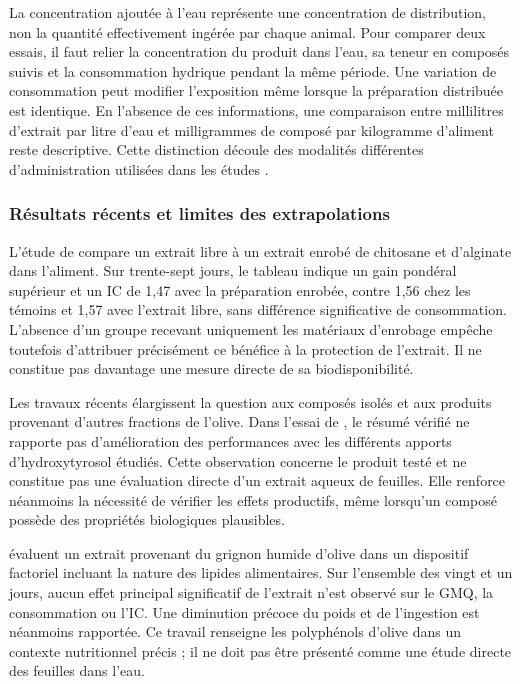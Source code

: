 La concentration ajoutée à l'eau représente une concentration de distribution, non la quantité effectivement ingérée par chaque animal. Pour comparer deux essais, il faut relier la concentration du produit dans l'eau, sa teneur en composés suivis et la consommation hydrique pendant la même période. Une variation de consommation peut modifier l'exposition même lorsque la préparation distribuée est identique. En l'absence de ces informations, une comparaison entre millilitres d'extrait par litre d'eau et milligrammes de composé par kilogramme d'aliment reste descriptive. Cette distinction découle des modalités différentes d'administration utilisées dans les études \citep{Jabri2017,Oke2017,Erener2020}.

\subsubsection{Résultats récents et limites des extrapolations}

L'étude de \citet{Hiba2026} compare un extrait libre à un extrait enrobé de chitosane et d'alginate dans l'aliment. Sur trente-sept jours, le tableau indique un gain pondéral supérieur et un IC de 1,47 avec la préparation enrobée, contre 1,56 chez les témoins et 1,57 avec l'extrait libre, sans différence significative de consommation. L'absence d'un groupe recevant uniquement les matériaux d'enrobage empêche toutefois d'attribuer précisément ce bénéfice à la protection de l'extrait. Il ne constitue pas davantage une mesure directe de sa biodisponibilité.

Les travaux récents élargissent la question aux composés isolés et aux produits provenant d'autres fractions de l'olive. Dans l'essai de \citet{Dias2024Performance}, le résumé vérifié ne rapporte pas d'amélioration des performances avec les différents apports d'hydroxytyrosol étudiés. Cette observation concerne le produit testé et ne constitue pas une évaluation directe d'un extrait aqueux de feuilles. Elle renforce néanmoins la nécessité de vérifier les effets productifs, même lorsqu'un composé possède des propriétés biologiques plausibles.

\citet{Sevillano2026} évaluent un extrait provenant du grignon humide d'olive dans un dispositif factoriel incluant la nature des lipides alimentaires. Sur l'ensemble des vingt et un jours, aucun effet principal significatif de l'extrait n'est observé sur le GMQ, la consommation ou l'IC. Une diminution précoce du poids et de l'ingestion est néanmoins rapportée. Ce travail renseigne les polyphénols d'olive dans un contexte nutritionnel précis ; il ne doit pas être présenté comme une étude directe des feuilles dans l'eau.

